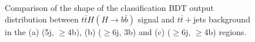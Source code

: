 \begin{figure}[t!]
\begin{center}
\begin{subfigure}{0.5\textwidth}
  \caption{}
  \label{sec:obj:fig:leff}
\end{subfigure}
\end{center}
\captionsetup{width=0.85\textwidth} \caption{\small Comparison of the shape of the classification BDT output distribution between $t\bar{t}H(H \to b\bar{b})$ signal and $t\bar{t}+$jets background in the (a) (5j, $\ge4$b), (b) ($\ge$6j, 3b) and (c) ($\ge$6j, $\ge$4b) regions.}
\label{sec:ttH:fig:classBDT}
\end{figure}
